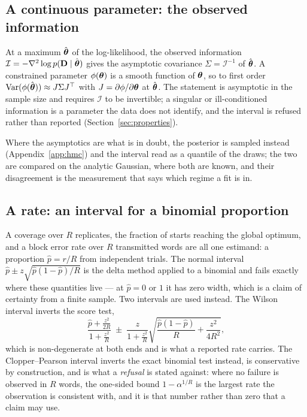 \documentclass[11pt,a4paper]{article}
\begin{document}
\subsection{A continuous parameter: the observed information}
\label{app:delta}
At a maximum $\hat{\boldsymbol{\theta}}$ of the log-likelihood, the observed information
$\mathcal{I} = -\nabla^2 \log p(\mathbf{D} \mid \hat{\boldsymbol{\theta}})$ gives the asymptotic
covariance $\Sigma = \mathcal{I}^{-1}$ of $\hat{\boldsymbol{\theta}}$. A constrained
parameter $\phi(\boldsymbol{\theta})$ is a smooth function of $\boldsymbol{\theta}$, so to first
order $\mathrm{Var}(\phi(\hat{\boldsymbol{\theta}})) \approx J \Sigma J^{\top}$ with
$J = \partial \phi / \partial \boldsymbol{\theta}$ at $\hat{\boldsymbol{\theta}}$. The statement
is asymptotic in the sample size and requires $\mathcal{I}$ to be invertible;
a singular or ill-conditioned information is a parameter the data does not
identify, and the interval is refused rather than reported
(Section~\ref{sec:properties}).

Where the asymptotics are what is in doubt, the posterior is sampled
instead (Appendix~\ref{app:hmc}) and the interval read as a quantile of the
draws; the two are compared on the analytic Gaussian, where both are known,
and their disagreement is the measurement that says which regime a fit is in.

\subsection{A rate: an interval for a binomial proportion}

A coverage over $R$ replicates, the fraction of starts reaching the global
optimum, and a block error rate over $R$ transmitted words are all one
estimand: a proportion $\hat{p} = r/R$ from independent trials. The normal
interval $\hat p \pm z\sqrt{\hat p (1 - \hat p)/R}$ is the delta method
applied to a binomial and fails exactly where these quantities live --- at
$\hat p = 0$ or $1$ it has zero width, which is a claim of certainty from a
finite sample. Two intervals are used instead. The Wilson interval inverts the
score test,
\begin{equation}
  \frac{\hat p + \frac{z^2}{2R}}{1 + \frac{z^2}{R}}
  \;\pm\;
  \frac{z}{1 + \frac{z^2}{R}}
  \sqrt{\frac{\hat p (1 - \hat p)}{R} + \frac{z^2}{4R^2}},
  \label{eq:wilson}
\end{equation}
which is non-degenerate at both ends and is what a reported rate carries. The
Clopper--Pearson interval inverts the exact binomial test instead, is
conservative by construction, and is what a \emph{refusal} is stated against:
where no failure is observed in $R$ words, the one-sided bound
$1 - \alpha^{1/R}$ is the largest rate the observation is consistent with, and
it is that number rather than zero that a claim may use.
\end{document}

